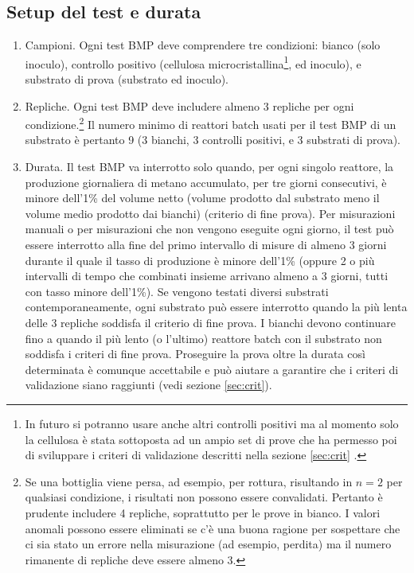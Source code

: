 \documentclass[]{article}
\begin{document}
\subsection{Setup del test e durata}
\label{sec:setup}
\begin{enumerate}
  \item Campioni. 
    Ogni test BMP deve comprendere tre condizioni: bianco (solo inoculo), controllo positivo (cellulosa microcristallina\footnote{
      In futuro si potranno usare anche altri controlli positivi \citep{kochEvaluationCommonSupermarket2020} ma al momento solo la cellulosa è stata sottoposta ad un ampio set di prove che ha permesso poi di sviluppare i criteri di validazione descritti nella sezione \ref{sec:crit} \citep{hafnerImprovingInterlaboratoryReproducibility2020}.
    }, ed inoculo), e substrato di prova (substrato ed inoculo).
  \item Repliche. 
    Ogni test BMP deve includere almeno 3 repliche per ogni condizione.\footnote{
      Se una bottiglia viene persa, ad esempio, per rottura, risultando in $n=2$ per qualsiasi condizione, i risultati non possono essere convalidati.
      Pertanto è prudente includere 4 repliche, soprattutto per le prove in bianco.
      I valori anomali possono essere eliminati se c'è una buona ragione per sospettare che ci sia stato un errore nella misurazione (ad esempio, perdita) ma il numero rimanente di repliche deve essere almeno 3. 
    }
    Il numero minimo di reattori batch usati per il test BMP di un substrato è pertanto 9 (3 bianchi, 3 controlli positivi, e 3 substrati di prova).
  \item Durata. 
    Il test BMP va interrotto solo quando, per ogni singolo reattore, la produzione giornaliera di metano accumulato, per tre giorni consecutivi, è minore dell’1\% del volume netto (volume prodotto dal substrato meno il volume medio prodotto dai bianchi) (criterio di fine prova). 
    Per misurazioni manuali o per misurazioni che non vengono eseguite ogni giorno, il test può essere interrotto alla fine del primo intervallo di misure di almeno 3 giorni durante il quale il tasso di produzione è minore dell’1\% (oppure 2 o più intervalli di tempo che combinati insieme arrivano almeno a 3 giorni, tutti con tasso minore dell’1\%). 
    Se vengono testati diversi substrati contemporaneamente, ogni substrato può essere interrotto quando la più lenta delle 3 repliche soddisfa il criterio di fine prova. 
    I bianchi devono continuare fino a quando il più lento (o l’ultimo) reattore batch con il substrato non soddisfa i criteri di fine prova. 
    Proseguire la prova oltre la durata così determinata è comunque accettabile e può aiutare a garantire che i criteri di validazione siano raggiunti (vedi sezione \ref{sec:crit}).
\end{enumerate}
\end{document}
